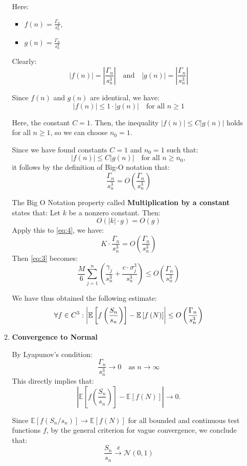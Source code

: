 \begin{itemize}
\begin{enumerate}
Here:
\begin{itemize}
    \item \( f(n) = \frac{\Gamma_n}{s_n^3} \),
    \item \( g(n) = \frac{\Gamma_n}{s_n^3} \)
\end{itemize}

Clearly:
\[
|f(n)| = \left| \frac{\Gamma_n}{s_n^3} \right| \quad \text{and} \quad |g(n)| = \left| \frac{\Gamma_n}{s_n^3} \right|
\]

Since \( f(n) \) and \( g(n) \) are identical, we have:
\[
|f(n)| \leq 1 \cdot |g(n)| \quad \text{for all } n \geq 1
\]


Here, the constant \( C = 1 \). Then, the inequality \( |f(n)| \leq C |g(n)| \) holds for all \( n \geq 1 \), so we can choose \( n_0 = 1 \).

Since we have found constants \( C = 1 \) and \( n_0 = 1 \) such that:
\[
|f(n)| \leq C |g(n)| \quad \text{for all } n \geq n_0,
\]
it follows by the definition of Big-O notation that:
\begin{equation} \label{eq:4}
\frac{\Gamma_n}{s_n^3} = O\left(\frac{\Gamma_n}{s_n^3}\right)
\end{equation}

The Big O Notation property called \textbf{Multiplication by a constant} states that:
Let \( k \) be a nonzero constant. Then:
\[
O(|k| \cdot g) = O(g)
\]
Apply this to \eqref{eq:4}, we have:
   \[
   K \cdot \frac{\Gamma_n}{s_n^3} = O\left(\frac{\Gamma_n}{s_n^3}\right)
   \]
Then \eqref{eq:3} becomes:
\[
\frac{M}{6} \sum_{j=1}^n \left( \frac{\gamma_j}{s_n^3} + \frac{c \cdot \sigma_j^3}{s_n^3} \right) \leq O\left(\frac{\Gamma_n}{s_n^3}\right)
\]

We have thus obtained the following estimate:
\[
\forall f \in C^3: \left| \space  \mathbb{E}\left[f\left(\frac{S_n}{s_n}\right)\right] - \mathbb{E}\left[f\left(N\right)\right] \right| \leq O\left(\frac{\Gamma_n}{s_n^3}\right) 
\]

\item \textbf{Convergence to Normal}

By Lyapunov's condition:
\[
\frac{\Gamma_n}{s_n^3} \to 0 \quad \text{as } n \to \infty
\]
This directly implies that:
\[
\left| \mathbb{E}\left[f\left(\frac{S_n}{s_n}\right)\right] - \mathbb{E}\left[f(N)\right] \right| \to 0.
\]

Since \( \mathbb{E}[f(S_n / s_n)] \to \mathbb{E}[f(N)] \) for all bounded and continuous test functions \( f \), by the general criterion for vague convergence, we conclude that:
\[
\frac{S_n}{s_n} \xrightarrow{d} \mathcal{N}(0, 1)
\]

    \end{enumerate}
\end{itemize}




